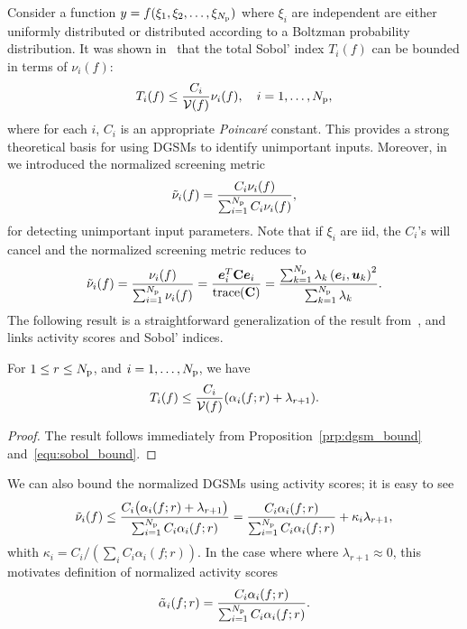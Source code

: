 Consider a function $y = f(\xi_1, \xi_2, \ldots, \xi_{N_\text{p}})$ where
$\xi_i$ are independent are either uniformly distributed or
distributed according to a Boltzman probability distribution.  
It was shown in~\cite{Lamboni:2013} that the total Sobol' 
index $T_i(f)$ can be bounded in terms of $\nu_i(f)$:
\begin{equation}\label{equ:sobol_bound}
T_i(f) \leq \frac{C_i}{\mathcal{V}(f)}\nu_i(f), \quad i = 1, \ldots, {N_\text{p}},
\end{equation}
where for each $i$, $C_i$ is an appropriate \emph{Poincar\'{e}} constant.
This provides a strong theoretical basis for using DGSMs to identify 
unimportant inputs. Moreover, 
in~\cite{Vohra:2018} we introduced the normalized screening metric
\[
   \tilde{\nu}_i(f) = \frac{C_i \nu_i(f)}{\sum_{i=1}^{N_\text{p}} C_i \nu_i(f)},
\]
for detecting unimportant input parameters. 
Note that if $\xi_i$ are iid, the $C_i$'s will cancel and the normalized screening
metric reduces to 
\[
    \tilde{\nu}_i(f) = \frac{\nu_i(f)}{\sum_{i=1}^\Np \nu_i(f)} 
      = \frac{\vec{e}_i^T \mat{C} \vec{e}_i}{\trace(\mat{C})} 
      = \frac{\sum_{k=1}^\Np \lambda_k \ip{\vec{e}_i}{\vec{u}_k}^2}{\sum_{k = 1}^\Np \lambda_k}.
\]
The following result is a straightforward generalization of
the result from~\cite{Diaz:2016}, and 
links activity scores and Sobol' indices.
\begin{proposition}
For $1 \leq r \leq {N_\text{p}}$, and $i = 1, \ldots, {N_\text{p}}$, we have
\[
       T_i(f) \leq \frac{C_i}{\mathcal{V}(f)}(\alpha_i(f; r) + \lambda_{r+1}).
\]
\end{proposition}
\begin{proof}
The result follows immediately from Proposition~\ref{prp:dgsm_bound} and~\eqref{equ:sobol_bound}.
\end{proof}
We can also bound the normalized DGSMs using activity scores; it is easy to see  
\[
\tilde{\nu}_i(f) \leq 
\frac{ C_i \big(\alpha_i(f; r) + \lambda_{r+1}\big)}{\sum_{i=1}^{N_\text{p}} C_i \alpha_i(f; r)}
=\frac{C_i \alpha_i(f; r)}{\sum_{i=1}^{N_\text{p}} C_i \alpha_i(f; r)} + \kappa_i \lambda_{r+1}, 
\]
whith $\kappa_i = C_i / (\sum_i C_i \alpha_i(f; r))$. 
In the case where where $\lambda_{r+1} \approx 0$, 
this motivates definition of
normalized activity scores
\[
   \tilde{\alpha}_i(f; r) =  \frac{C_i \alpha_i(f; r)}{\sum_{i=1}^{N_\text{p}} C_i \alpha_i(f; r)}.
\] 

